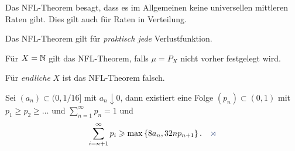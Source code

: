 \begin{bem*}[Bemerkungen.]
\begin{bemenum}
\item Das NFL-Theorem besagt, dass es im Allgemeinen keine universellen
mittleren Raten gibt. Dies gilt auch für Raten in Verteilung.
\item Das NFL-Theorem gilt für \textit{praktisch jede} Verlustfunktion.
\item Für $X=\mathbb{N}$ gilt das NFL-Theorem, falls $\mu=P_X$ nicht vorher festgelegt
wird.
\item Für \textit{endliche} $X$ ist das NFL-Theorem falsch.\maphere
\end{bemenum}
\end{bem*}

\begin{lem}
\label{prop:1.4.5}
Sei $(a_n) \subset (0,1/16]$ mit $a_n\downarrow 0$, dann existiert eine Folge
$(p_n)\subset (0,1)$ mit $p_1\ge p_2 \ge \ldots$ und $\sum_{n=1}^\infty p_n =
1$ und
\begin{align*}
\sum_{i=n+1}^\infty p_i \ge \max\setd{8a_n,32n p_{n+1}}.\fishhere
\end{align*}
\end{lem}
